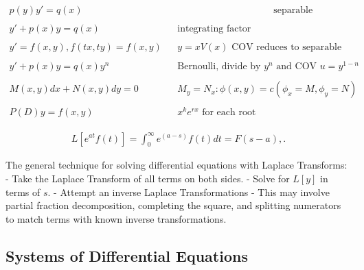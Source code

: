 \begin{align*}
p(y)y' = q(x)                  &  & \hspace{10em} \text{separable} \\ \\
y'+p(x)y = q(x)                &  & \text{integrating factor} \\ \\
y' = f(x,y), f(tx,ty) = f(x,y) &  & y = xV(x)\text{ COV reduces to separable} \\ \\
y' +p(x)y = q(x)y^n            &  & \text{Bernoulli, divide by $y^n$ and COV $u = y^{1-n}$} \\ \\
M(x,y)dx + N(x,y)dy = 0        &  & M_y = N_x: \phi(x,y) = c (\phi_x =M, \phi_y = N) \\ \\
P(D)y = f(x,y)                 &  & x^ke^{rx} \text{ for each root }
\end{align*}

\begin{theorem}

\begin{align*}  
L[e^{at} f(t)] = \int_0^\infty e^{(a-s)}f(t)dt = F(s-a),
.\end{align*}

\end{theorem}

\begin{remark}

The general technique for solving differential equations with Laplace
Transforms: - Take the Laplace Transform of all terms on both sides. -
Solve for \(L[y]\) in terms of \(s\). - Attempt an inverse Laplace
Transformations - This may involve partial fraction decomposition,
completing the square, and splitting numerators to match terms with
known inverse transformations.

\end{remark}

\hypertarget{systems-of-differential-equations-1}{%
\subsection{Systems of Differential
Equations}\label{systems-of-differential-equations-1}}

